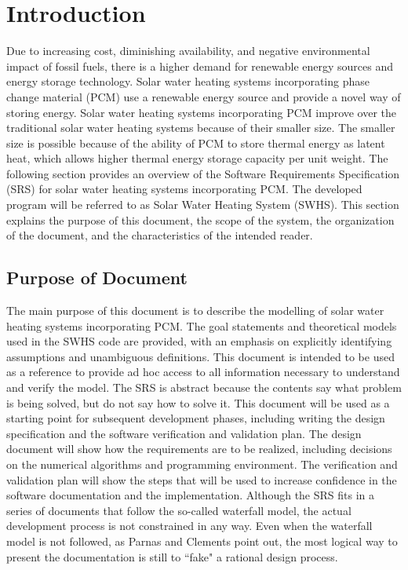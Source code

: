 \documentclass[12pt]{article}
\begin{document}
\section{Introduction}
\label{Sec:Intr}
Due to increasing cost, diminishing availability, and negative environmental impact of fossil fuels, there is a higher demand for renewable energy sources and energy storage technology. Solar water heating systems incorporating phase change material (PCM) use a renewable energy source and provide a novel way of storing energy. Solar water heating systems incorporating PCM improve over the traditional solar water heating systems because of their smaller size. The smaller size is possible because of the ability of PCM to store thermal energy as latent heat, which allows higher thermal energy storage capacity per unit weight.
The following section provides an overview of the Software Requirements Specification (SRS) for solar water heating systems incorporating PCM. The developed program will be referred to as Solar Water Heating System (SWHS). This section explains the purpose of this document, the scope of the system, the organization of the document, and the characteristics of the intended reader.
\subsection{Purpose of Document}
\label{Sec:PurpofDocu}
The main purpose of this document is to describe the modelling of solar water heating systems incorporating PCM. The goal statements and theoretical models used in the SWHS code are provided, with an emphasis on explicitly identifying assumptions and unambiguous definitions. This document is intended to be used as a reference to provide ad hoc access to all information necessary to understand and verify the model. The SRS is abstract because the contents say what problem is being solved, but do not say how to solve it.
This document will be used as a starting point for subsequent development phases, including writing the design specification and the software verification and validation plan. The design document will show how the requirements are to be realized, including decisions on the numerical algorithms and programming environment. The verification and validation plan will show the steps that will be used to increase confidence in the software documentation and the implementation. Although the SRS fits in a series of documents that follow the so-called waterfall model, the actual development process is not constrained in any way. Even when the waterfall model is not followed, as Parnas and Clements point out, the most logical way to present the documentation is still to ``fake" a rational design process.
\end{document}
